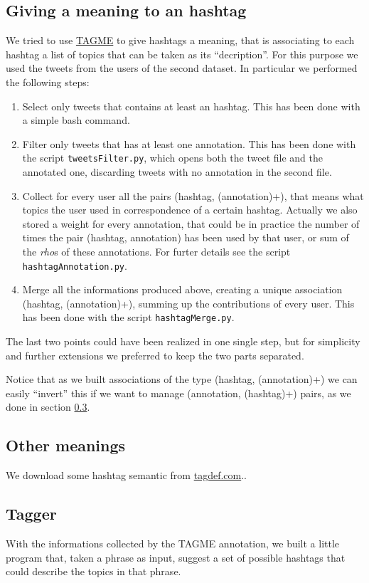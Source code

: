 \documentclass[a4paper,11pt,oneside]{article}
\begin{document}
\subsection{Giving a meaning to an hashtag}
We tried to use \href{http://tagme.di.unipi.it/}{TAGME} to give hashtags a meaning, that is associating to each hashtag a list of topics that can be taken as its ``decription''. For this purpose we used the tweets from the users of the second dataset.
In particular we performed the following steps:
\begin{enumerate}
\item Select only tweets that contains at least an hashtag. This has been done with a simple bash command.
\item Filter only tweets that has at least one annotation. This has been done with the script \texttt{tweetsFilter.py}, which opens both the tweet file and the annotated one, discarding tweets with no annotation in the second file.
\item Collect for every user all the pairs (hashtag, (annotation)+), that means what topics the user used in correspondence of a certain hashtag. Actually we also stored a weight for every annotation, that could be in practice the number of times the pair (hashtag, annotation) has been used by that user, or sum of the \textit{rho}s of these annotations. For furter details see the script \texttt{hashtagAnnotation.py}.
\item Merge all the informations produced above, creating a unique association (hashtag, (annotation)+), summing up the contributions of every user. This has been done with the script \texttt{hashtagMerge.py}.
\end{enumerate}

The last two points could have been realized in one single step, but for simplicity and further extensions we preferred to keep the two parts separated.

Notice that as we built associations of the type (hashtag, (annotation)+) we can easily ``invert'' this if we want to manage (annotation, (hashtag)+) pairs, as we done in section \ref{sec:tagger}.	


\subsection{Other meanings}
We download some hashtag semantic from \href{http://tagdef.com/}{tagdef.com}..

\subsection{Tagger}
\label{sec:tagger}
With the informations collected by the TAGME annotation, we built a little program that, taken a phrase as input, suggest a set of possible hashtags that could describe the topics in that phrase.
\end{document}
